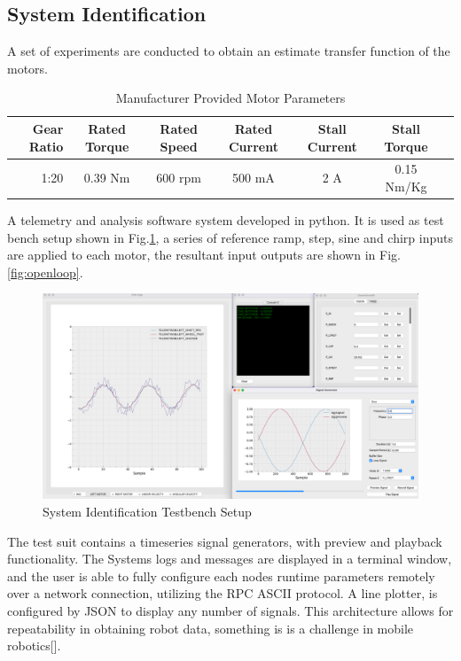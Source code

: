         \pagebreak{}

        \subsection{System Identification}
        A set of experiments are conducted to obtain an estimate transfer function of the motors.
        \begin{table}[H]
            \centering
                \begin{tabular}{|r|c|c|c|c|c|c|}
                    \hline 
                    Gear Ratio & Rated Torque & Rated Speed  & Rated Current & Stall Current & Stall Torque \\
                    \hline
                     1:20  & 0.39 Nm & 600 rpm & 500 mA & 2 A & 0.15 Nm/Kg \\
                    \hline
                \end{tabular}
                \caption{Manufacturer Provided Motor Parameters}
        \end{table}
        A telemetry and analysis software system developed in python. It is used as test bench 
        setup shown in Fig.\ref{fig:SysIDSetUp}, a series of reference ramp, step, sine and 
        chirp inputs are applied to each motor, the resultant input outputs are shown 
        in Fig.\ref{fig:openloop}.
       
        \begin{figure}[H]
            \centering
            \includegraphics[height=0.45\textwidth]{SysIDMotorSetUp.png}
            \caption{System Identification Testbench Setup}
            \label{fig:SysIDSetUp}
        \end{figure}
        The test suit contains a timeseries signal generators, with preview and playback functionality.
        The Systems logs and messages are displayed in a terminal window, and the user is able to fully configure 
        each nodes runtime parameters remotely over a network connection, utilizing the RPC ASCII protocol.
        A line plotter, is configured by JSON to display any number of signals.
        This architecture allows for repeatability in obtaining robot data, something 
        is is a challenge in mobile robotics[]. 
        
